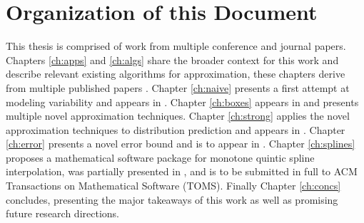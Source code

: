 \section{Organization of this Document}

This thesis is comprised of work from multiple conference and journal
papers. Chapters \ref{ch:apps} and \ref{ch:algs} share the broader
context for this work and describe relevant existing algorithms for
approximation, these chapters derive from multiple published papers
\cite{lux2018predictive,lux2020effective,lux2020interpolation}. Chapter
\ref{ch:naive} presents a first attempt at modeling variability and
appears in \cite{lux2018predictive}. Chapter \ref{ch:boxes} appears in
\cite{lux2018novel} and presents multiple novel approximation
techniques. Chapter \ref{ch:strong} applies the novel approximation
techniques to distribution prediction and appears in
\cite{lux2018nonparametric}. Chapter \ref{ch:error} presents a novel
error bound and is to appear in \cite{lux2020interpolation}.  Chapter
\ref{ch:splines} proposes a mathematical software package for monotone
quintic spline interpolation, was partially presented in
\cite{lux2020algorithm}, and is to be submitted in full to ACM
Transactions on Mathematical Software (TOMS). Finally Chapter
\ref{ch:concs} concludes, presenting the major takeaways of this work
as well as promising future research directions.
